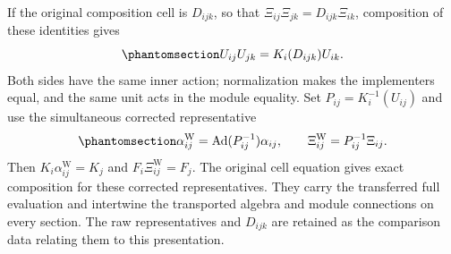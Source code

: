 \documentclass[
  english,
  11pt,
  reqno]{amsart}
\begin{document}
If the original composition cell is \(D_{ijk}\), so that
\(\Xi_{ij}\Xi_{jk}=D_{ijk}\Xi_{ik}\), composition of these identities
gives
\begin{equation}\protect\phantomsection\label{eq:analytic-global-physical-overlap-cell}{
U_{ij}U_{jk}=K_i(D_{ijk})U_{ik}.
}\end{equation} Both sides have the same inner action; normalization
makes the implementers equal, and the same unit acts in the module
equality. Set \(P_{ij}=K_i^{-1}(U_{ij})\) and use the simultaneous
corrected representative
\begin{equation}\protect\phantomsection\label{eq:analytic-global-corrected-physical-overlaps}{
\alpha^{\mathrm W}_{ij}
 =\operatorname{Ad}(P_{ij}^{-1})\alpha_{ij},
\qquad
\Xi^{\mathrm W}_{ij}=P_{ij}^{-1}\Xi_{ij}.
}\end{equation} Then \(K_i\alpha^{\mathrm W}_{ij}=K_j\) and
\(F_i\Xi^{\mathrm W}_{ij}=F_j\). The original cell equation gives exact
composition for these corrected representatives. They carry the
transferred full evaluation and intertwine the transported algebra and
module connections on every section. The raw representatives and
\(D_{ijk}\) are retained as the comparison data relating them to this
presentation.
\end{document}
